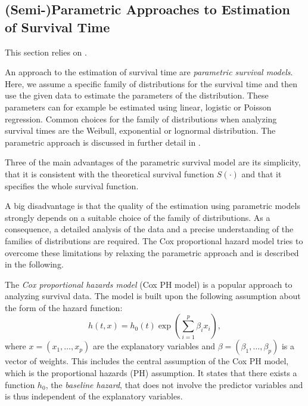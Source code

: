 \documentclass[12pt, a4paper]{scrartcl}
\theoremstyle{definition}
\theoremstyle{plain}
\numberwithin{equation}{section}
\numberwithin{figure}{section}
\numberwithin{table}{section}
\begin{document}
	
	\subsection{(Semi-)Parametric Approaches to Estimation of Survival Time} \label{cox}

	This section relies on \citet*{sabook}.
	
	An approach to the estimation of survival time are \emph{parametric survival models}.
	Here, we assume a specific family of distributions for the survival time and then use the given data to estimate the parameters of the distribution.
	These parameters can for example be estimated using linear, logistic or Poisson regression.
	Common choices for the family of distributions when analyzing survival times are the Weibull, exponential or lognormal distribution.
	The parametric approach is discussed in further detail in \citet*{sabook}.
	
	Three of the main advantages of the parametric survival model are its simplicity,  that it is consistent with the theoretical survival function $S(\cdot)$ and that it specifies the whole survival function.
	
	A big disadvantage is that the quality of the estimation using parametric models strongly depends on a suitable choice of the family of distributions.
	As a consequence, a detailed analysis of the data and a precise understanding of the families of distributions are required.
	The Cox proportional hazard model tries to overcome these limitations by relaxing the parametric approach and is described in the following.
	
	The \emph{Cox proportional hazards model} (Cox PH model) is a popular approach to analyzing survival data.
	The model is built upon the following assumption about the form of the hazard function:
	\begin{equation*}
	h(t,x) = h_0(t) \exp \left(\sum_{i=1}^p \beta_i x_i\right),
	\end{equation*}
	where $x=(x_1,\dots,x_p)$ are the explanatory variables and $\beta = (\beta_1,\dots, \beta_p)$ is a vector of weights.
	This includes the central assumption of the Cox PH model, which is the proportional hazards (PH) assumption.
	It states that there exists a function $h_0$, the \emph{baseline hazard}, that does not involve the predictor variables and is thus independent of the explanatory variables.
\end{document}
